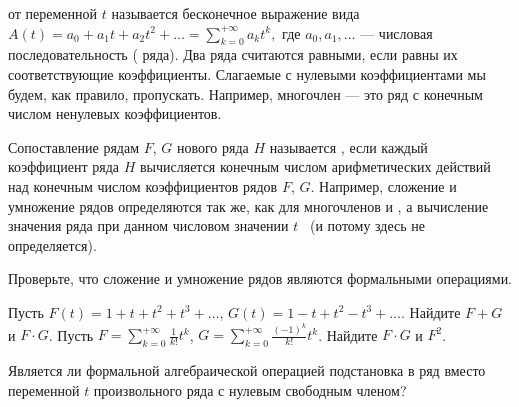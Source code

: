 \documentclass[a4paper,12pt]{article}
\begin{document}



{}
 от переменной $t$
называется бесконечное выражение вида
$
A(t)=a_0+a_1t+a_2t^2+\dots=\sum\limits_{k=0}^{+\infty} a_kt^k,
$
где $a_0,a_1,\dots$ --- числовая последовательность
( ряда).
Два ряда считаются равными, если равны их соответствующие коэффициенты.
Слагаемые с нулевыми коэффициентами мы
будем, как правило, пропускать. Например, многочлен --- это ряд с конечным
числом ненулевых коэффициентов.

\noindent
Сопоставление рядам $F$, $G$ нового ряда $H$ называется
, если каждый коэффициент
ряда $H$ вычисляется конечным числом арифметических действий над
конечным числом коэффициентов рядов $F$, $G$. Например, сложение и
умножение рядов определяются так же, как для многочленов и
, а
 вычисление значения ряда при данном числовом значении $t$\
 (и потому здесь не определяется).
%








Проверьте, что сложение и умножение рядов являются формальными операциями.









 Пусть $F(t)=1+t+t^2+t^3+\ldots$,
$G(t)=1-t+t^2-t^3+\ldots$.
Найдите $F+G$ и $F\cdot G$.
 Пусть $F=\sum\limits_{k=0}^{+\infty}\frac{1}{k!}t^k$,
$G=\sum\limits_{k=0}^{+\infty}\frac{(-1)^k}{k!}t^k$.
Найдите $F\cdot G$ и $F^2$.









Является ли формальной алгебраической операцией подстановка
в ряд вместо переменной $t$ произвольного ряда с нулевым свободным членом?
\кзадача
\end{document}
